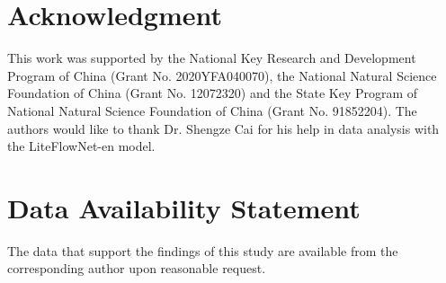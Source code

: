 \documentclass[%
 aip,
 amsmath,amssymb,
 reprint,%
]{revtex4-1}
\begin{document}





\section*{Acknowledgment}
This work was supported by the National Key Research and Development Program of China (Grant No. 2020YFA040070), the National Natural Science Foundation of China (Grant No. 12072320) and the State Key Program of National Natural Science Foundation of China (Grant No. 91852204).
The authors would like to thank Dr. Shengze Cai for his help in data analysis with the LiteFlowNet-en model.

\section*{Data Availability Statement}

The data that support the findings of this study are available from the corresponding author upon reasonable request.

\end{document}
